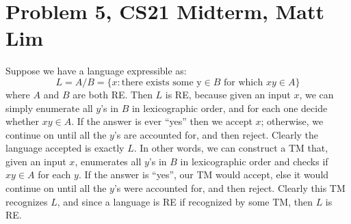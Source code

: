 \documentclass{article}
\begin{document}
\section*{Problem 5, CS21 Midterm, Matt Lim}
Suppose we have a language expressible as:
\[ L = A/B = \{x : \text{there exists some y} \in B \text{ for which } xy \in
A\} \]
where $A$ and $B$ are both RE. Then $L$ is RE, because given an input $x$,
we can simply enumerate all $y$'s in $B$ in lexicographic order, and for each
one decide whether $xy \in A$. If the answer is ever ``yes'' then we accept
$x$; otherwise, we continue on until all the $y$'s are accounted for, and then
reject. Clearly the language accepted is
exactly $L$. In other words, we can construct a TM that, given an input $x$,
enumerates all $y$'s in $B$ in lexicographic order and checks if $xy \in A$
for each $y$. If the answer is ``yes'', our TM would accept, else it would
continue on until all the $y$'s were accounted for, and then reject. Clearly
this TM recognizes $L$, and since a language is RE if recognized by some TM,
then $L$ is RE.
\end{document}

